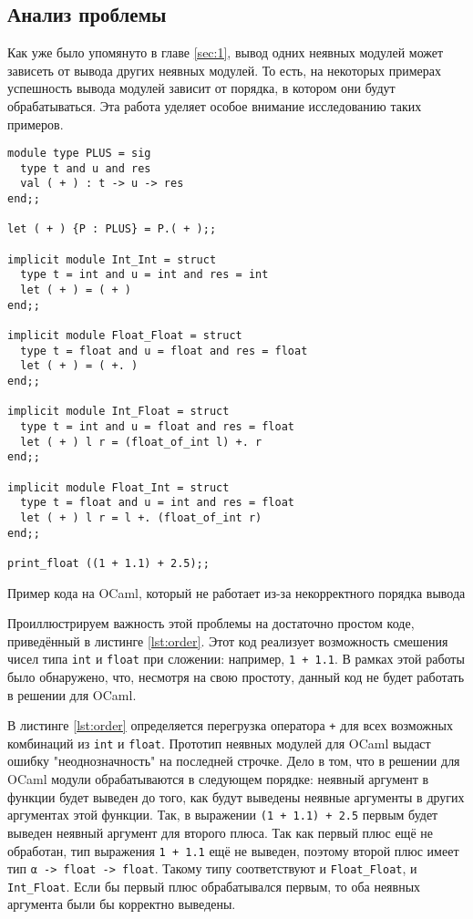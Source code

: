 \documentclass[../diploma.tex]{subfiles}
\begin{document}
\label{sec:3}

\subsection{Анализ проблемы}

Как уже было упомянуто в главе \ref{sec:1}, вывод одних неявных модулей может зависеть от вывода других неявных модулей. То есть, на некоторых примерах успешность вывода модулей зависит от порядка, в котором они будут обрабатываться. Эта работа уделяет особое внимание исследованию таких примеров.

\begin{listing}[H]
\begin{verbatim}
module type PLUS = sig
  type t and u and res
  val ( + ) : t -> u -> res
end;;

let ( + ) {P : PLUS} = P.( + );;

implicit module Int_Int = struct
  type t = int and u = int and res = int
  let ( + ) = ( + )
end;;

implicit module Float_Float = struct
  type t = float and u = float and res = float
  let ( + ) = ( +. )
end;;

implicit module Int_Float = struct
  type t = int and u = float and res = float
  let ( + ) l r = (float_of_int l) +. r
end;;

implicit module Float_Int = struct
  type t = float and u = int and res = float
  let ( + ) l r = l +. (float_of_int r)
end;;

print_float ((1 + 1.1) + 2.5);;
\end{verbatim}
\caption{Пример кода на OCaml, который не работает из-за некорректного порядка вывода}
\label{lst:order}
\end{listing}

Проиллюстрируем важность этой проблемы на достаточно простом коде, приведённый в листинге \ref{lst:order}. Этот код реализует возможность смешения чисел типа \texttt{int} и \texttt{float} при сложении: например, \texttt{1 + 1.1}. В рамках этой работы было обнаружено, что, несмотря на свою простоту, данный код не будет работать в решении для OCaml.

В листинге \ref{lst:order} определяется перегрузка оператора \texttt{+} для всех возможных комбинаций из \texttt{int} и \texttt{float}. Прототип неявных модулей для OCaml выдаст ошибку "неоднозначность" на последней строчке. Дело в том, что в решении для OCaml модули обрабатываются в следующем порядке: неявный аргумент в функции будет выведен до того, как будут выведены неявные аргументы в других аргументах этой функции. Так, в выражении \texttt{(1 + 1.1) + 2.5} первым будет выведен неявный аргумент для второго плюса. Так как первый плюс ещё не обработан, тип выражения \texttt{1 + 1.1} ещё не выведен, поэтому второй плюс имеет тип \texttt{α -> float -> float}. Такому типу соответствуют и \texttt{Float_Float}, и \texttt{Int_Float}. Если бы первый плюс обрабатывался первым, то оба неявных аргумента были бы корректно выведены.
\end{document}

